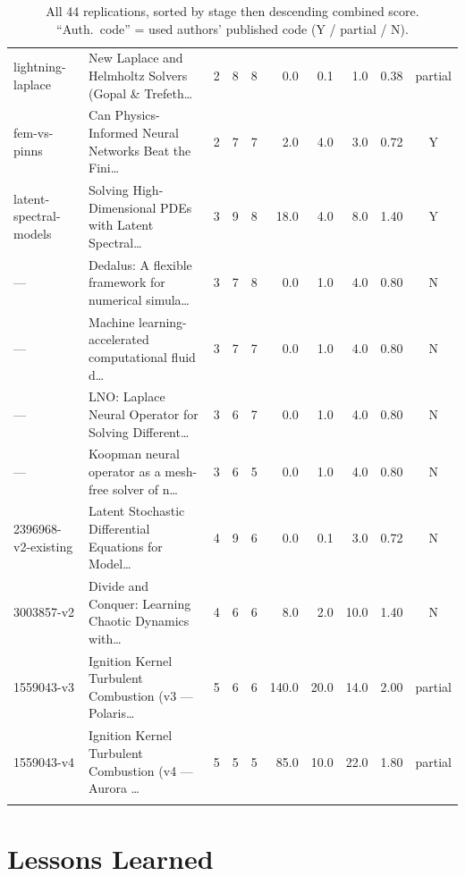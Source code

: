 \documentclass[11pt,letterpaper]{article}
\begin{document}
\begin{landscape}
\begin{longtable}{p{2.6cm}p{6.0cm}c c c r r r r c}
lightning-laplace & New Laplace and Helmholtz Solvers (Gopal \& Trefeth… & 2 & 8 & 8 & 0.0 & 0.1 & 1.0 & 0.38 & partial \\
fem-vs-pinns & Can Physics-Informed Neural Networks Beat the Fini… & 2 & 7 & 7 & 2.0 & 4.0 & 3.0 & 0.72 & Y \\
latent-spectral-models & Solving High-Dimensional PDEs with Latent Spectral… & 3 & 9 & 8 & 18.0 & 4.0 & 8.0 & 1.40 & Y \\
— & Dedalus: A flexible framework for numerical simula… & 3 & 7 & 8 & 0.0 & 1.0 & 4.0 & 0.80 & N \\
— & Machine learning-accelerated computational fluid d… & 3 & 7 & 7 & 0.0 & 1.0 & 4.0 & 0.80 & N \\
— & LNO: Laplace Neural Operator for Solving Different… & 3 & 6 & 7 & 0.0 & 1.0 & 4.0 & 0.80 & N \\
— & Koopman neural operator as a mesh-free solver of n… & 3 & 6 & 5 & 0.0 & 1.0 & 4.0 & 0.80 & N \\
2396968-v2-existing & Latent Stochastic Differential Equations for Model… & 4 & 9 & 6 & 0.0 & 0.1 & 3.0 & 0.72 & N \\
3003857-v2 & Divide and Conquer: Learning Chaotic Dynamics with… & 4 & 6 & 6 & 8.0 & 2.0 & 10.0 & 1.40 & N \\
1559043-v3 & Ignition Kernel Turbulent Combustion (v3 — Polaris… & 5 & 6 & 6 & 140.0 & 20.0 & 14.0 & 2.00 & partial \\
1559043-v4 & Ignition Kernel Turbulent Combustion (v4 — Aurora … & 5 & 5 & 5 & 85.0 & 10.0 & 22.0 & 1.80 & partial \\
\bottomrule
\caption{All 44 replications, sorted by stage then descending combined score. ``Auth.\ code'' = used authors' published code (Y / partial / N).}
\end{longtable}
\normalsize
\end{landscape}

\section{Lessons Learned}
\end{document}
